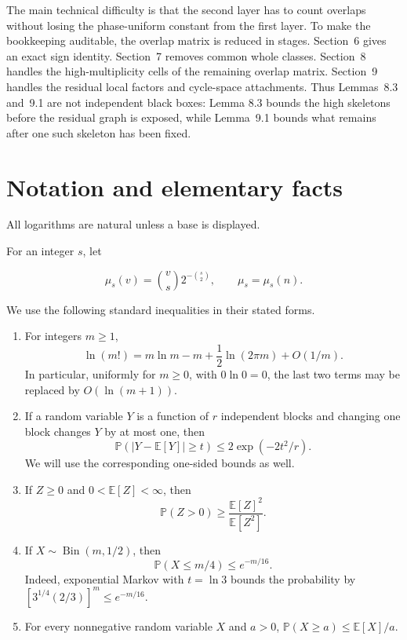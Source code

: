 \documentclass[11pt,reqno]{amsart}
\providecommand{\tightlist}{%
  \setlength{\itemsep}{0pt}\setlength{\parskip}{0pt}}
\newcommand{\Prob}[1]{\mathbb{P}\!\left(#1\right)}
\newcommand{\Exp}[1]{\mathbb{E}\!\left[#1\right]}
\begin{document}
The main technical difficulty is that the second layer has to count overlaps
without losing the phase-uniform constant from the first layer.  To make the
bookkeeping auditable, the overlap matrix is reduced in stages.  Section~6
gives an exact sign identity.  Section~7 removes common whole classes.
Section~8 handles the high-multiplicity cells of the remaining overlap
matrix.  Section~9 handles the residual local factors and cycle-space
attachments.  Thus Lemmas~8.3 and~9.1 are not independent black boxes: Lemma
8.3 bounds the high skeletons before the residual graph is exposed, while
Lemma~9.1 bounds what remains after one such skeleton has been fixed.

\section{Notation and elementary
facts}\label{notation-and-elementary-facts}

All logarithms are natural unless a base is displayed.

For an integer \(s\), let

\[
 \mu_s(v)=\binom vs2^{-\binom s2},\qquad \mu_s=\mu_s(n). \tag{1.1}
\]

We use the following standard inequalities in their stated forms.

\begin{enumerate}
\def\labelenumi{\arabic{enumi}.}
\tightlist
\item
  For integers \(m\ge 1\), \[
   \ln(m!)=m\ln m-m+\frac12\ln(2\pi m)+O(1/m).          \tag{1.2}
  \] In particular, uniformly for \(m\ge 0\), with
  \(0\ln 0=0\), the last two terms may be replaced by
  \(O(\ln(m+1))\).
\item
  If a random variable \(Y\) is a function of \(r\)
  independent blocks and changing one block changes \(Y\) by at
  most one, then \[
   \Prob{\lvert Y-\Exp{Y}\rvert\ge t}
   \le2\exp(-2t^2/r).                                    \tag{1.3}
  \] We will use the corresponding one-sided bounds as well.
\item
  If \(Z\ge 0\) and \(0<\Exp{Z}<\infty\), then \[
   \Prob{Z>0}\ge\frac{\Exp{Z}^2}{\Exp{Z^2}}.             \tag{1.4}
  \]
\item
  If \(X\sim\operatorname{Bin}(m,1/2)\), then \[
   \Prob{X\le m/4}\le e^{-m/16}.                         \tag{1.5}
  \] Indeed, exponential Markov with \(t=\ln 3\) bounds the
  probability by
  \([3^{1/4}(2/3)]^m\le e^{-m/16}\).
\item
  For every nonnegative random variable \(X\) and \(a>0\),
  \(\Prob{X\ge a}\le \Exp{X}/a\).
\end{enumerate}
\end{document}
